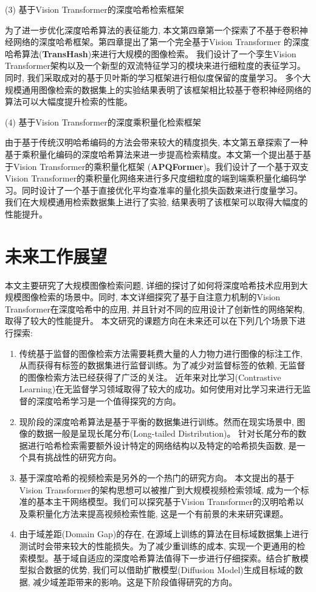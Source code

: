 (3) 基于Vision Transformer的深度哈希检索框架 \par
为了进一步优化深度哈希算法的表征能力, 本文第四章第一个探索了不基于卷积神经网络的深度哈希框架。第四章提出了第一个完全基于Vision Transformer 的深度哈希算法(\textbf{TransHash})来进行大规模的图像检索。 我们设计了一个孪生Vision Transformer架构以及一个新型的双流特征学习的模块来进行细粒度的表征学习。 同时, 我们采取成对的基于贝叶斯的学习框架进行相似度保留的度量学习。 多个大规模通用图像检索的数据集上的实验结果表明了该框架相比较基于卷积神经网络的算法可以大幅度提升检索的性能。\par
(4) 基于Vision Transformer的深度乘积量化检索框架 \par
由于基于传统汉明哈希编码的方法会带来较大的精度损失, 本文第五章探索了一种基于乘积量化编码的深度哈希算法来进一步提高检索精度。本文第一个提出基于基于Vision Transformer的乘积量化框架 (\textbf{APQFormer})。我们设计了一个基于双支Vision Transformer的乘积量化网络来进行多尺度细粒度的端到端乘积量化编码学习。同时设计了一个基于直接优化平均查准率的量化损失函数来进行度量学习。 我们在大规模通用检索数据集上进行了实验, 结果表明了该框架可以取得大幅度的性能提升。

\section{未来工作展望}
本文主要研究了大规模图像检索问题, 详细的探讨了如何将深度哈希技术应用到大规模图像检索的场景中。同时, 本文详细探究了基于自注意力机制的Vision Transformer在深度哈希中的应用, 并且针对不同的应用设计了创新性的网络架构, 取得了较大的性能提升。 本文研究的课题方向在未来还可以在下列几个场景下进行探索:
\begin{enumerate}
    \item 传统基于监督的图像检索方法需要耗费大量的人力物力进行图像的标注工作, 从而获得有标签的数据集进行监督训练。为了减少对监督标签的依赖, 无监督的图像检索方法已经获得了广泛的关注。 近年来对比学习(Contrastive Learning)在无监督学习领域取得了较大的成功。如何使用对比学习来进行无监督的深度哈希学习是一个值得探究的方向。
    \item 现阶段的深度哈希算法是基于平衡的数据集进行训练。然而在现实场景中, 图像的数据一般是呈现长尾分布(Long-tailed Distribution)。 针对长尾分布的数据进行哈希检索需要额外设计特定的网络结构以及特定的哈希损失函数, 是一个具有挑战性的研究方向。
    \item 基于深度哈希的视频检索是另外的一个热门的研究方向。 本文提出的基于Vision Transformer的架构思想可以被推广到大规模视频检索领域, 成为一个标准的基本主干网络模型。我们可以探究基于Vision Transformer的汉明哈希以及乘积量化方法来提高视频检索性能, 这是一个有前景的未来研究课题。
    \item 由于域差距(Domain Gap)的存在, 在源域上训练的算法在目标域数据集上进行测试时会带来较大的性能损失。为了减少重训练的成本, 实现一个更通用的检索模型。基于域自适应的深度哈希算法值得下一步进行仔细探索。结合扩散模型拟合数据的优势, 我们可以借助扩散模型(Diffusion Model)生成目标域的数据, 减少域差距带来的影响。这是下阶段值得研究的方向。
\end{enumerate}